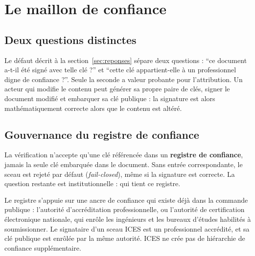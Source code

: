 \documentclass[11pt,a4paper]{article}
\begin{document}

\section{Le maillon de confiance}\label{sec:confiance}

\subsection{Deux questions distinctes}

Le défaut décrit à la section~\ref{sec:reponses} sépare deux questions : \enquote{ce document a-t-il été signé avec telle clé ?} et \enquote{cette clé appartient-elle à un professionnel digne de confiance ?}. Seule la seconde a valeur probante pour l'attribution. Un acteur qui modifie le contenu peut générer sa propre paire de clés, signer le document modifié et embarquer sa clé publique : la signature est alors mathématiquement correcte alors que le contenu est altéré.

\subsection{Gouvernance du registre de confiance}

La vérification n'accepte qu'une clé référencée dans un \textbf{registre de confiance}, jamais la seule clé embarquée dans le document. Sans entrée correspondante, le sceau est rejeté par défaut (\emph{fail-closed}), même si la signature est correcte. La question restante est institutionnelle : qui tient ce registre.

Le registre s'appuie sur une ancre de confiance qui existe déjà dans la commande publique : l'autorité d'accréditation professionnelle, ou l'autorité de certification électronique nationale, qui enrôle les ingénieurs et les bureaux d'études habilités à soumissionner. Le signataire d'un sceau ICES est un professionnel accrédité, et sa clé publique est enrôlée par la même autorité. ICES ne crée pas de hiérarchie de confiance supplémentaire.
\end{document}
